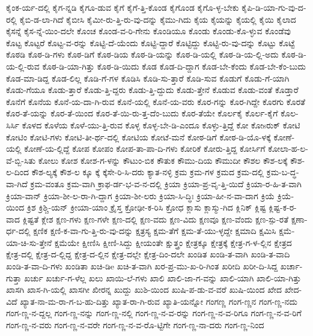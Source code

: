 {ಕೈಂಕ-ರ್ಯ-ದಲ್ಲಿ
ಕೈಗ-ನ್ನಡಿ
ಕೈಗೂ-ಡುವ
ಕೈಗೆ
ಕೈಗೆ-ತ್ತಿ-ಕೊಂಡ
ಕೈಗೊಂಡ
ಕೈಗೊ-ಳ್ಳ-ಬೇಕು
ಕೈಪಿ-ಡಿ-ಯಾ-ಗು-ವು-ದ-ರಲ್ಲಿ
ಕೈಬಿ-ಡ-ಲಾ-ಗಿದೆ
ಕೈಬೀಸಿ
ಕೈಮೀ-ರು-ತ್ತಿ-ರು-ವು-ದನ್ನು
ಕೈಮು-ಗಿದು
ಕೈಯ
ಕೈಯನ್ನು
ಕೈಯಲ್ಲಿ
ಕೈಯಿ
ಕೈಲಾದ
ಕೈಸನ್ನೆ
ಕೈಸ-ನ್ನೆ-ಯಿಂ-ದಲೇ
ಕೊಂಚ
ಕೊಂಡ-ವ-ರಿ-ಗೇನು
ಕೊಂಡಿಯೂ
ಕೊಂಡು
ಕೊಂಡು-ಕೊ-ಳ್ಳುವ
ಕೊಂಡೆವು
ಕೊಟ್ಟ
ಕೊಟ್ಟರೆ
ಕೊಟ್ಟ-ವ-ರನ್ನು
ಕೊಟ್ಟಿ-ದೆ-ಯೆಂದು
ಕೊಟ್ಟಿ-ದ್ದಾರೆ
ಕೊಟ್ಟಿದ್ದು
ಕೊಟ್ಟಿ-ರು-ವು-ದನ್ನು
ಕೊಟ್ಟು
ಕೊಟ್ಟೆ
ಕೊಠಡಿ
ಕೊಠ-ಡಿ-ಗಳು
ಕೊಠ-ಡಿಗೆ
ಕೊಠ-ಡಿಯ
ಕೊಠ-ಡಿ-ಯನ್ನು
ಕೊಠ-ಡಿ-ಯಲ್ಲಿ
ಕೊಠ-ಡಿ-ಯ-ಲ್ಲಿ-ಅದು
ಕೊಠ-ಡಿ-ಯ-ಲ್ಲಿ-ರುವ
ಕೊಠ-ಡಿ-ಯಾ-ಗಿತ್ತು
ಕೊಠ-ಡಿ-ಯಿದು
ಕೊಡ
ಕೊಡ-ದಿ-ದ್ದಾಗ
ಕೊಡ-ಬೇ-ಕೆಂದು
ಕೊಡ-ಬೇ-ಕೆಂ-ಬುದು
ಕೊಡ-ಮಾ-ಡಿದ್ದ
ಕೊಡ-ಲಿಲ್ಲ
ಕೊಡಿ-ಗೆ-ಗಳ
ಕೊಡಿಸಿ
ಕೊಡಿ-ಸು-ತ್ತಾರೆ
ಕೊಡಿ-ಸುವ
ಕೊಡುಗೆ
ಕೊಡು-ಗೆ-ಯಾಗಿ
ಕೊಡು-ಗೆಯೂ
ಕೊಡು-ತ್ತಾರೆ
ಕೊಡು-ತ್ತಿ-ದ್ದರು
ಕೊಡು-ತ್ತಿ-ದ್ದುದು
ಕೊಡು-ತ್ತೇನೆ
ಕೊಡುವ
ಕೊಡು-ವಂತೆ
ಕೊಡ್ತಾರೆ
ಕೊನೆಗೆ
ಕೊನೆಯ
ಕೊನೆ-ಯ-ದಾ-ಗಿ-ರುವ
ಕೊನೆ-ಯಲ್ಲಿ
ಕೊನೆ-ಯ-ವರು
ಕೊರ-ಗನ್ನು
ಕೊರ-ಗಿದ್ದೇ
ಕೊರಗು
ಕೊರತೆ
ಕೊರ-ತೆ-ಯನ್ನು
ಕೊರ-ತೆ-ಯಿಂದ
ಕೊರ-ತೆ-ಯಿ-ರು-ತ್ತ-ದೆಂ-ಬುದು
ಕೊರ-ತೆಯೇ
ಕೊರ್ಲಕೈ
ಕೊರ್ಲ-ಕೈಗೆ
ಕೊಲ-ಸಿರ್ಸಿ
ಕೊಳದ
ಕೊಳೆಯ
ಕೊಳೆ-ಯು-ತ್ತಿ-ರುವ
ಕೊಳ್ಳ
ಕೊಳ್ಳ-ಬೇ-ಡಿ-ಎಂದೂ
ಕೊಳ್ಳು-ತ್ತಿದ್ದೆ
ಕೋ
ಕೋsರುಕ್
ಕೋಟಿ
ಕೋಟಿಂ
ಕೋಟಿ-ಗಳು
ಕೋಟಿ-ತೀ-ರ್ಥ-ದಲ್ಲಿ
ಕೋಟಿಯ
ಕೋಟೆ-ಮನೆ
ಕೋಠ-ಡಿಗೆ
ಕೋಠ-ಡಿ-ಯೊ-ಳಕ್ಕೆ
ಕೋಣೆ-ಯಲ್ಲಿ
ಕೋಣೆ-ಯ-ಲ್ಲಿದ್ದೆ
ಕೋಪ
ಕೋಪಂ
ಕೋಪ-ತಾ-ಪಾ-ದಿ-ಗಳು
ಕೋರಿಕೆ
ಕೋರು-ತ್ತಿದ್ದ
ಕೋರ್ಸಿಗೆ
ಕೋಲಾ-ಹ-ಲ-ವೆ-ಬ್ಬಿ-ಸಿತು
ಕೋಲು
ಕೋಶ
ಕೋಶ-ಗ-ಳನ್ನು
ಕೌಟುಂ-ಬಿಕ
ಕೌತುಕ
ಕೌಮು-ದಿಯ
ಕೌಮುದೀ
ಕೌಶಲ
ಕೌಶ-ಲಕ್ಕೆ
ಕೌಶ-ಲ-ದಿಂದ
ಕೌಶ-ಲ್ಯಕ್ಕೆ
ಕೌಶ-ಲ
ಕ್ಕೂ
ಕ್ಕೆ
ಕ್ಕೆಸೇ-ರಿ-ಸಿ-ದರು
ಕ್ಯಾತ-ನಳ್ಳಿ
ಕ್ರಮ
ಕ್ರಮ-ಗಳ
ಕ್ರಮದ
ಕ್ರಮ-ದಲ್ಲಿ
ಕ್ರಮ-ಬ-ದ್ಧ-ವಾ-ಗಿದೆ
ಕ್ರಮ-ವಂತೂ
ಕ್ರಮ-ವಾಗಿ
ಕ್ರಾಫ-ರ್ಡ-ಭ-ವ-ನ-ದಲ್ಲಿ
ಕ್ರಿಯಾ
ಕ್ರಿಯಾ-ಪ್ರ-ವೃ-ತ್ತಿ-ಯಿದೆ
ಕ್ರಿಯಾ-ರ-ಹಿ-ತ-ವಾಗಿ
ಕ್ರಿಯಾ-ವಾನ್
ಕ್ರಿಯಾ-ಶೀ-ಲ-ರಾ-ಗಿ-ದ್ದಾಗ
ಕ್ರಿಯಾ-ಶೀ-ಲರು
ಕ್ರಿಯಾ-ಸಿ-ದ್ಧಿಃ
ಕ್ರಿಯಾ-ಹೀ-ನ-ವಾ-ದಾಗ
ಕ್ರಿಯೆ
ಕ್ರಿಯೆ-ಯಿಂದ
ಕ್ರಿಶ
ಕ್ರಿಶ್ಚಿ-ಯನ್
ಕ್ರೀಯಾ-ಯಾಂ
ಕ್ರೈಸ್ತ
ಕ್ರೋಢೀ-ಕ-ರಿಸಿ
ಕ್ರೋಧ
ಕ್ಲಾಸು
ಕ್ಲಾಸ್ಮು-ಗಿದ
ಕ್ಲಿನಿಕ್
ಕ್ಲಿಷ್ಟ
ಕ್ಲಿಷ್ಟ-ಕ-ರ-ವಾದ
ಕ್ಲಿಷ್ಟತೆ
ಕ್ಲೇಶ
ಕ್ಷಣ-ಗಳು
ಕ್ಷಣ-ಗಳೇ
ಕ್ಷಣ-ದಲ್ಲಿ
ಕ್ಷಣ-ವದು
ಕ್ಷಣ-ವಿದು
ಕ್ಷಣವೂ
ಕ್ಷಣ-ವೆಂದು
ಕ್ಷಣ-ಸ್ಪು-ರತೆ
ಕ್ಷಣಾ-ರ್ಧ-ದಲ್ಲಿ
ಕ್ಷಣಿಕ
ಕ್ಷಣಿ-ಕ-ವಾ-ಗು-ತ್ತಿ-ರು-ವು-ದನ್ನು
ಕ್ಷತ್ರಸ್ಯ
ಕ್ಷಮ-ತೆಗೆ
ಕ್ಷಮ-ತೆ-ಯು-ಳ್ಳದ್ದೇ
ಕ್ಷಮಾದಿ
ಕ್ಷಮಿಸಿ
ಕ್ಷಮೆ-ಯಾ-ಚಿ-ಸು-ತ್ತೇನೆ
ಕ್ಷಮೆಯೇ
ಕ್ಷೀಣಿಸಿ
ಕ್ಷೀಣಿ-ಸಿದ್ದು
ಕ್ಷೀಯಂತೇ
ಕ್ಷುತ್ತ್ರಂ
ಕ್ಷೇತ್ರಕ್ಕೂ
ಕ್ಷೇತ್ರಕ್ಕೆ
ಕ್ಷೇತ್ರ-ಗ-ಳ-ಲ್ಲಿನ
ಕ್ಷೇತ್ರದ
ಕ್ಷೇತ್ರ-ದಲ್ಲಿ
ಕ್ಷೇತ್ರ-ದ-ಲ್ಲಿದ್ದ
ಕ್ಷೇತ್ರ-ದ-ಲ್ಲಿನ
ಕ್ಷೇತ್ರ-ದಲ್ಲೇ
ಕ್ಷೇತ್ರ-ದಿಂ-ದಲೇ
ಖಂಡಿತ
ಖಂಡಿ-ತ-ವಾಗಿ
ಖಂಡಿ-ತ-ವಾದಿ
ಖಂಡಿ-ತ-ವಾ-ದಿ-ಗಳು
ಖಂಡಿತಾ
ಖಚಿ-ಡಿe
ಖಚಿ-ತ-ವಾಗಿ
ಖರ-ಪ್ರ-ಮು-ಖ-ರಿ-ಗಿಂತ
ಖರೀದಿ
ಖರೀ-ದಿ-ಸಿದ್ದ
ಖರ್ಚಾ-ಗುತ್ತಾ
ಖರ್ಚು
ಖರ್ಚು-ಗ-ಳೆಲ್ಲ
ಖಲು
ಖಾಯಿ-ಲೆ-ಗಳು
ಖಾಲಿ
ಖಾಲಿ-ಜಾ-ಗ-ವನ್ನು
ಖಾಲಿ-ಯಾಗಿ
ಖಾಲಿ-ಯಾ-ಗಿತ್ತು
ಖಾಸಗಿ
ಖಾಸ-ಗಿ-ಯಲ್ಲಿ
ಖಾಸಗೀ
ಖೀರನ್ನ
ಖುದ್ದು
ಖುಶಿ-ಯಿಂದ
ಖುಷಿ-ಪ-ಡು-ವ-ವರೆ
ಖುಷಿ-ಯಿಂದ
ಖೇದ
ಖೇದ-ವಿದೆ
ಖ್ಯಾತ-ನಾ-ಮ-ರಾ-ಗ-ಬ-ಹು-ದಿತ್ತು
ಖ್ಯಾತ-ರಾ-ಗಿ-ರುವ
ಖ್ಯಾತಿ-ಯನ್ನೋ
ಗಂಗಣ್ಣ
ಗಂಗ-ಣ್ಣನ
ಗಂಗ-ಣ್ಣ-ನದು
ಗಂಗ-ಣ್ಣ-ನ-ದ್ದಲ್ಲ
ಗಂಗ-ಣ್ಣ-ನನ್ನು
ಗಂಗ-ಣ್ಣ-ನಲ್ಲಿ
ಗಂಗ-ಣ್ಣ-ನ-ವ-ರನ್ನು
ಗಂಗ-ಣ್ಣ-ನ-ವ-ರಿಗೂ
ಗಂಗ-ಣ್ಣ-ನ-ವ-ರಿಗೆ
ಗಂಗ-ಣ್ಣ-ನ-ವರು
ಗಂಗ-ಣ್ಣ-ನ-ವರೇ
ಗಂಗ-ಣ್ಣ-ನ-ವ-ರೊ-ಟ್ಟಿಗೇ
ಗಂಗ-ಣ್ಣ-ನಾ-ದರು
ಗಂಗ-ಣ್ಣ-ನಿಂದ
}
